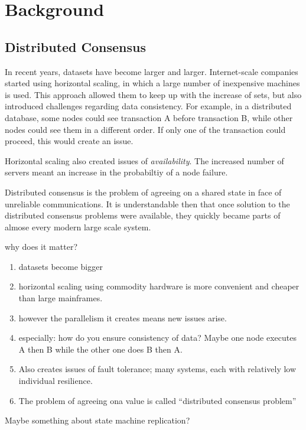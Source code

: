\chapter{Background}

\section{Distributed Consensus}

In recent years, datasets have become larger and larger.
Internet-scale companies started using horizontal scaling, in which a large number of inexpensive machines is used.
This approach allowed them to keep up with the increase of sets, but also introduced challenges regarding data consistency.
For example, in a distributed database, some nodes could see transaction A before transaction B, while other nodes could see them in a different order.
If only one of the transaction could proceed, this would create an issue.

Horizontal scaling also created issues of \emph{availability}.
The increased number of servers meant an increase in the probabiltiy of a node failure.

Distributed consensus is the problem of agreeing on a shared state in face of unreliable communications.
It is understandable then that once solution to the distributed consensus problems were available, they quickly became parts of almose every modern large scale system.

why does it matter?

\begin{enumerate}
    \item datasets become bigger 
    \item horizontal scaling using commodity hardware is more convenient and cheaper than large mainframes.
    \item however the parallelism it creates means new issues arise.
    \item especially: how do you ensure consistency of data?
        Maybe one node executes A then B while the other one does B then A.
    \item Also creates issues of fault tolerance; many systems, each with relatively low individual resilience.
    \item The problem of agreeing ona value is called ``distributed consensus problem''
\end{enumerate}

Maybe something about state machine replication?

